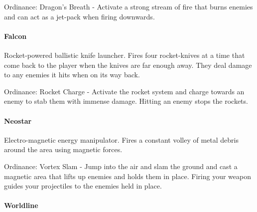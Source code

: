 \documentclass[../Main.tex]{subfiles}
\begin{document}
Ordinance: Dragon's Breath - Activate a strong stream of fire that burns enemies and can act as a jet-pack when firing downwards.

\paragraph{Falcon}

Rocket-powered ballistic knife launcher. Fires four rocket-knives at a time that come back to the player when the knives are far enough away. They deal damage to any enemies it hits when on its way back.

Ordinance: Rocket Charge - Activate the rocket system and charge towards an enemy to stab them with immense damage. Hitting an enemy stops the rockets. 

\paragraph{Neostar}

Electro-magnetic energy manipulator. Fires a constant volley of metal debris around the area using magnetic forces.

Ordinance: Vortex Slam - Jump into the air and slam the ground and cast a magnetic area that lifts up enemies and holds them in place. Firing your weapon guides your projectiles to the enemies held in place.

\paragraph{Worldline}
\end{document}
